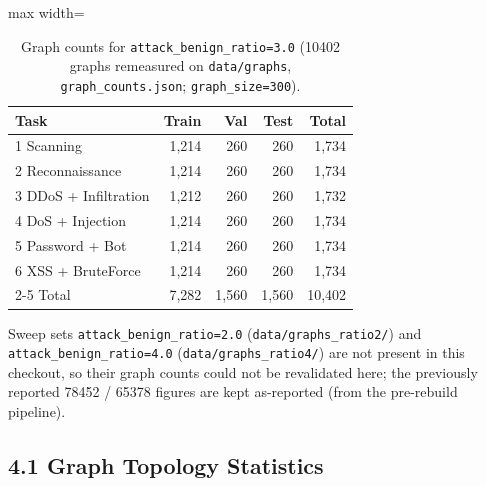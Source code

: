 \documentclass[11pt,a4paper]{article}
\begin{document}
\begin{table}[H]
\centering
\caption{Graph counts for \texttt{attack\_benign\_ratio=3.0} (\num{10402} graphs remeasured on \texttt{data/graphs}, \texttt{graph\_counts.json}; \texttt{graph\_size=300}).}
\label{tab:graph-counts}
\begin{adjustbox}{max width=\textwidth}
\begin{tabular}{lrrrr}
\toprule
Task & Train & Val & Test & Total \\
\midrule
1 Scanning & 1,214 & 260 & 260 & 1,734 \\
2 Reconnaissance & 1,214 & 260 & 260 & 1,734 \\
3 DDoS + Infiltration & 1,212 & 260 & 260 & 1,732 \\
4 DoS + Injection & 1,214 & 260 & 260 & 1,734 \\
5 Password + Bot & 1,214 & 260 & 260 & 1,734 \\
6 XSS + BruteForce & 1,214 & 260 & 260 & 1,734 \\
\cmidrule{2-5}
Total & 7,282 & 1,560 & 1,560 & 10,402 \\
\bottomrule
\end{tabular}
\end{adjustbox}
\end{table}

Sweep sets \texttt{attack\_benign\_ratio=2.0} (\texttt{data/graphs\_ratio2/}) and \texttt{attack\_benign\_ratio=4.0} (\texttt{data/graphs\_ratio4/}) are not present in this checkout, so their graph counts could not be revalidated here; the previously reported \num{78452} / \num{65378} figures are kept as-reported (from the pre-rebuild pipeline).

\subsection*{4.1 Graph Topology Statistics}
\end{document}
